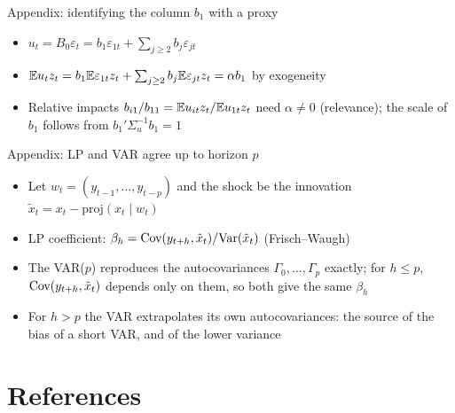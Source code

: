 \begin{frame}{Appendix: identifying the column $b_1$ with a proxy}
\hypertarget{atsapp2}{}
\itemsize{\small}
\begin{itemize}
    \item $u_t = B_0\varepsilon_t = b_1\varepsilon_{1t} + \sum_{j\ge2}b_j\varepsilon_{jt}$
    \item $\mathbb{E} u_tz_t = b_1\mathbb{E}\varepsilon_{1t}z_t + \sum_{j\ge2}b_j\mathbb{E}\varepsilon_{jt}z_t = \alpha b_1$ by exogeneity
    \item Relative impacts $b_{i1}/b_{11} = \mathbb{E} u_{it}z_t/\mathbb{E} u_{1t}z_t$ need $\alpha \ne 0$ (relevance); the scale of $b_1$ follows from $b_1'\Sigma_u^{-1}b_1 = 1$
\end{itemize}
\end{frame}

\begin{frame}{Appendix: LP and VAR agree up to horizon $p$}
\hypertarget{atsapp3}{}
\itemsize{\small}
\begin{itemize}
    \item Let $w_t = (y_{t-1}, \dots, y_{t-p})$ and the shock be the innovation $\tilde x_t = x_t - \mathrm{proj}(x_t\mid w_t)$
    \item LP coefficient: $\beta_h = \text{Cov}(y_{t+h}, \tilde x_t)/\text{Var}(\tilde x_t)$ (Frisch--Waugh)
    \item The VAR($p$) reproduces the autocovariances $\Gamma_0, \dots, \Gamma_p$ exactly; for $h \le p$, $\text{Cov}(y_{t+h}, \tilde x_t)$ depends only on them, so both give the same $\beta_h$ 
    \item For $h > p$ the VAR extrapolates its own autocovariances: the source of the bias of a short VAR, and of the lower variance
\end{itemize}
\end{frame}


\section{References}

